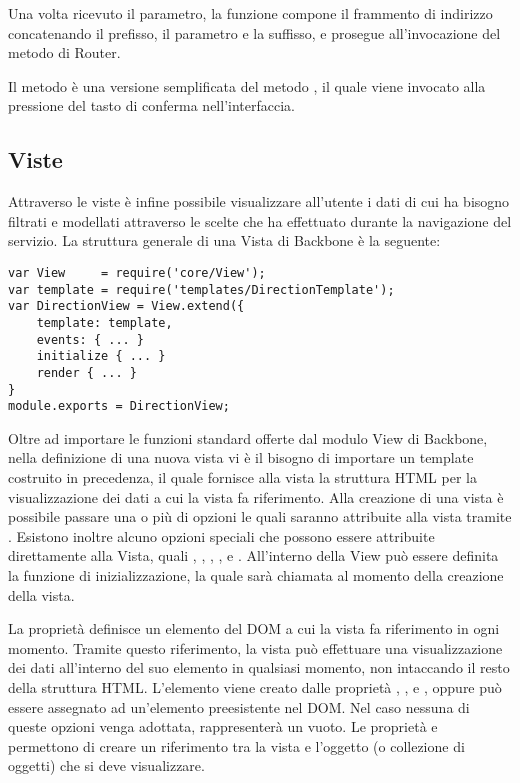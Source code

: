  Una volta ricevuto il parametro, la funzione  compone il frammento di indirizzo concatenando il prefisso, il parametro e la suffisso, e prosegue all'invocazione del metodo  di Router.

 Il metodo  è una versione semplificata del metodo , il quale viene invocato alla pressione del tasto di conferma nell'interfaccia. 

\subsection{Viste} %
\label{sub:viste}

Attraverso le viste è infine possibile visualizzare all'utente i dati di cui ha bisogno filtrati e modellati attraverso le scelte che ha effettuato durante la navigazione del servizio.
La struttura generale di una Vista di Backbone è la seguente:
{\small
\begin{verbatim}
var View     = require('core/View');
var template = require('templates/DirectionTemplate');
var DirectionView = View.extend({    
    template: template,
    events: { ... }
    initialize { ... }
    render { ... }
}
module.exports = DirectionView;
\end{verbatim}
}

Oltre ad importare le funzioni standard offerte dal modulo View di Backbone, nella definizione di una nuova vista vi è il bisogno di importare un template costruito in precedenza, il quale fornisce alla vista la struttura HTML per la visualizzazione dei dati a cui la vista fa riferimento.
Alla creazione di una vista è possibile passare una o più di opzioni le quali saranno attribuite alla vista tramite . Esistono inoltre alcuno opzioni speciali che possono essere attribuite direttamente alla Vista, quali , , , ,   e . All'interno della View può essere definita la funzione di inizializzazione, la quale sarà chiamata al momento della creazione della vista.

La proprietà  definisce un elemento del DOM a cui la vista fa riferimento in ogni momento. Tramite questo riferimento, la vista può effettuare una visualizzazione dei dati all'interno del suo elemento  in qualsiasi momento, non intaccando il resto della struttura HTML. L'elemento  viene creato dalle proprietà , ,  e , oppure può essere assegnato ad un'elemento preesistente nel DOM. Nel caso nessuna di queste opzioni venga adottata,  rappresenterà un  vuoto.
Le proprietà  e  permettono di creare un riferimento tra la vista e l'oggetto (o collezione di oggetti) che si deve visualizzare.

